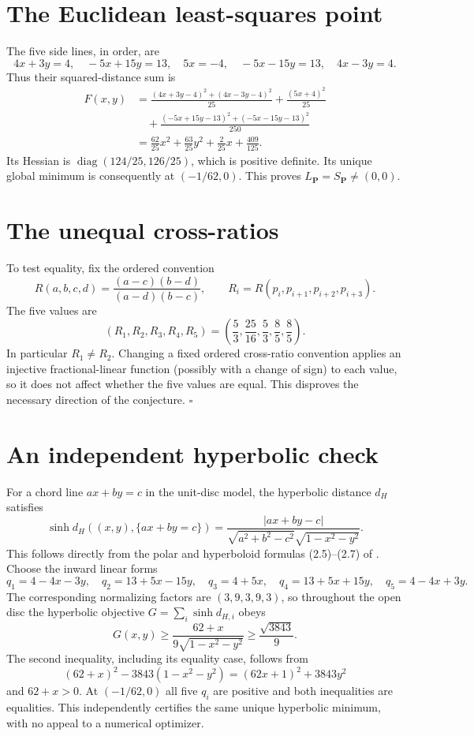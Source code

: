 \documentclass[11pt]{article}
\begin{document}
\section*{The Euclidean least-squares point}
The five side lines, in order, are
\[
 4x+3y=4,\quad -5x+15y=13,\quad 5x=-4,\quad
 -5x-15y=13,\quad 4x-3y=4.
\]
Thus their squared-distance sum is
\begin{align*}
 F(x,y)&=\frac{(4x+3y-4)^2+(4x-3y-4)^2}{25}
          +\frac{(5x+4)^2}{25}\\
 &\quad+\frac{(-5x+15y-13)^2+(-5x-15y-13)^2}{250}\\
 &=\frac{62}{25}x^2+\frac{63}{25}y^2+\frac2{25}x+\frac{409}{125}.
\end{align*}
Its Hessian is $\operatorname{diag}(124/25,126/25)$, which is positive
definite. Its unique global minimum is consequently at $(-1/62,0)$.
This proves $L_{\mathbf P}=S_{\mathbf P}\ne(0,0)$.

\section*{The unequal cross-ratios}
To test equality, fix the ordered convention
\[
 R(a,b,c,d)=\frac{(a-c)(b-d)}{(a-d)(b-c)},\qquad
 R_i=R(p_i,p_{i+1},p_{i+2},p_{i+3}).
\]
The five values are
\[
 (R_1,R_2,R_3,R_4,R_5)
       =\left(\frac53,\frac{25}{16},\frac53,\frac85,\frac85\right).
\]
In particular $R_1\ne R_2$. Changing a fixed ordered cross-ratio convention
applies an injective fractional-linear function (possibly with a change
of sign) to each value, so it does not affect whether the five values
are equal. This disproves the necessary direction of the conjecture.
\hfill$\square$

\section*{An independent hyperbolic check}
For a chord line $ax+by=c$ in the unit-disc model, the hyperbolic distance
$d_H$ satisfies
\[
 \sinh d_H((x,y),\{ax+by=c\})
 =\frac{|ax+by-c|}{\sqrt{a^2+b^2-c^2}\sqrt{1-x^2-y^2}}.
\]
This follows directly from the polar and hyperboloid formulas (2.5)--(2.7)
of \cite{AA}. Choose the inward linear forms
\[
 q_1=4-4x-3y,\quad q_2=13+5x-15y,\quad q_3=4+5x,\quad
 q_4=13+5x+15y,\quad q_5=4-4x+3y.
\]
The corresponding normalizing factors are $(3,9,3,9,3)$, so throughout
the open disc the hyperbolic objective $G=\sum_i\sinh d_{H,i}$ obeys
\[
 G(x,y)\ge \frac{62+x}{9\sqrt{1-x^2-y^2}}
             \ge\frac{\sqrt{3843}}9.
\]
The second inequality, including its equality case, follows from
\[
 (62+x)^2-3843(1-x^2-y^2)=(62x+1)^2+3843y^2
\]
and $62+x>0$. At $(-1/62,0)$ all five $q_i$ are positive and both
inequalities are equalities. This independently certifies the same unique
hyperbolic minimum, with no appeal to a numerical optimizer.
\end{document}
